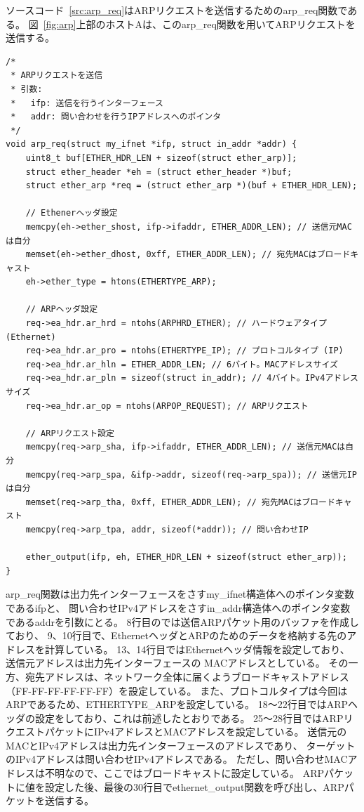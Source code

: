 ソースコード~\ref{src:arp_req}はARPリクエストを送信するためのarp\_req関数である。
図~\ref{fig:arp}上部のホストAは、このarp\_req関数を用いてARPリクエストを送信する。
\begin{lstlisting}[caption=arp\_req関数,label=src:arp_req]
/*
 * ARPリクエストを送信
 * 引数:
 *   ifp: 送信を行うインターフェース
 *   addr: 問い合わせを行うIPアドレスへのポインタ
 */
void arp_req(struct my_ifnet *ifp, struct in_addr *addr) {
    uint8_t buf[ETHER_HDR_LEN + sizeof(struct ether_arp)];
    struct ether_header *eh = (struct ether_header *)buf;
    struct ether_arp *req = (struct ether_arp *)(buf + ETHER_HDR_LEN);

    // Ethenerヘッダ設定
    memcpy(eh->ether_shost, ifp->ifaddr, ETHER_ADDR_LEN); // 送信元MACは自分
    memset(eh->ether_dhost, 0xff, ETHER_ADDR_LEN); // 宛先MACはブロードキャスト
    eh->ether_type = htons(ETHERTYPE_ARP);

    // ARPヘッダ設定
    req->ea_hdr.ar_hrd = ntohs(ARPHRD_ETHER); // ハードウェアタイプ (Ethernet)
    req->ea_hdr.ar_pro = ntohs(ETHERTYPE_IP); // プロトコルタイプ (IP)
    req->ea_hdr.ar_hln = ETHER_ADDR_LEN; // 6バイト。MACアドレスサイズ
    req->ea_hdr.ar_pln = sizeof(struct in_addr); // 4バイト。IPv4アドレスサイズ
    req->ea_hdr.ar_op = ntohs(ARPOP_REQUEST); // ARPリクエスト

    // ARPリクエスト設定
    memcpy(req->arp_sha, ifp->ifaddr, ETHER_ADDR_LEN); // 送信元MACは自分
    memcpy(req->arp_spa, &ifp->addr, sizeof(req->arp_spa)); // 送信元IPは自分
    memset(req->arp_tha, 0xff, ETHER_ADDR_LEN); // 宛先MACはブロードキャスト
    memcpy(req->arp_tpa, addr, sizeof(*addr)); // 問い合わせIP

    ether_output(ifp, eh, ETHER_HDR_LEN + sizeof(struct ether_arp));
}
\end{lstlisting}
arp\_req関数は出力先インターフェースをさすmy\_ifnet構造体へのポインタ変数であるifpと、
問い合わせIPv4アドレスをさすin\_addr構造体へのポインタ変数であるaddrを引数にとる。
8行目のでは送信ARPパケット用のバッファを作成しており、
9、10行目で、EthernetヘッダとARPのためのデータを格納する先のアドレスを計算している。
13、14行目ではEthernetヘッダ情報を設定しており、送信元アドレスは出力先インターフェースの
MACアドレスとしている。
その一方、宛先アドレスは、ネットワーク全体に届くようブロードキャストアドレス（FF-FF-FF-FF-FF-FF）を設定している。
また、プロトコルタイプは今回はARPであるため、ETHERTYPE\_ARPを設定している。
18〜22行目ではARPヘッダの設定をしており、これは前述したとおりである。
25〜28行目ではARPリクエストパケットにIPv4アドレスとMACアドレスを設定している。
送信元のMACとIPv4アドレスは出力先インターフェースのアドレスであり、
ターゲットのIPv4アドレスは問い合わせIPv4アドレスである。
ただし、問い合わせMACアドレスは不明なので、ここではブロードキャストに設定している。
ARPパケットに値を設定した後、最後の30行目でethernet\_output関数を呼び出し、ARPパケットを送信する。

